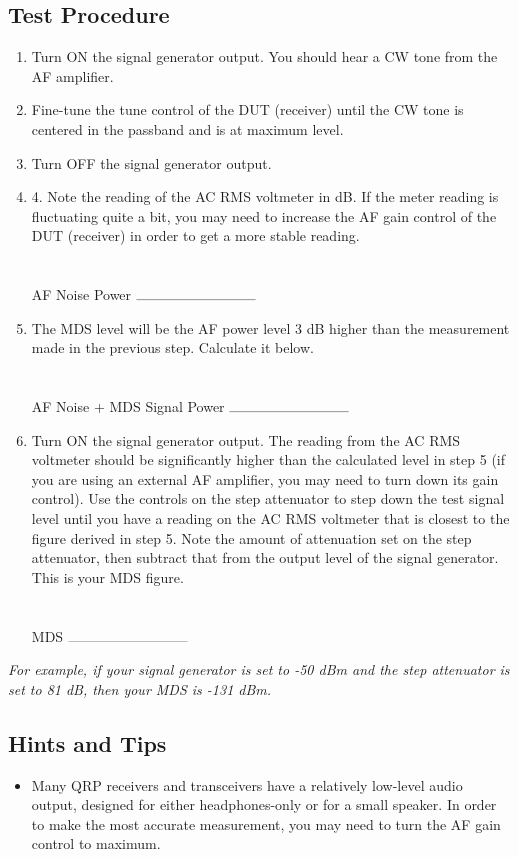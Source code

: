 \documentclass[10pt,letterpaper]{book}
\begin{document}
\subsection*{Test Procedure}
\begin{enumerate}
	\item Turn ON the signal generator output. You should hear a CW tone from the AF amplifier.
	\item Fine-tune the tune control of the DUT (receiver) until the CW tone is centered in the passband and is at maximum level.
	\item Turn OFF the signal generator output.
	\item 4. Note the reading of the AC RMS voltmeter in dB. If the meter reading is fluctuating quite a bit, you may need to increase the AF gain control of the DUT (receiver) in order to get a more stable reading. \\ \\ \\
	AF Noise Power $\rule{3cm}{0.1mm}$
	\item The MDS level will be the AF power level 3 dB higher than the measurement made in the previous step. Calculate it below. \\ \\ \\
	AF Noise + MDS Signal Power $\rule{3cm}{0.1mm}$
	\item Turn ON the signal generator output. The reading from the AC RMS voltmeter should be significantly higher than the calculated level in step 5 (if you are using an external AF amplifier, you may need to turn down its gain control). Use the controls on the step attenuator to step down the test signal level until you have a reading on the AC RMS voltmeter that is closest to the figure derived in step 5. Note the amount of attenuation set on the step attenuator, then subtract that from the output level of the signal generator. This is your MDS figure. \\ \\ \\
	MDS $\rule{3cm}{0.1mm}$
\end{enumerate}
\emph{For example, if your signal generator is set to -50 dBm and the step attenuator is set to 81 dB, then your MDS is -131 dBm.}
\subsection*{Hints and Tips}
\begin{itemize}
	\item Many QRP receivers and transceivers have a relatively low-level audio output, designed for either headphones-only or for a small speaker. In order to make the most accurate measurement, you may need to turn the AF gain control to maximum.
\end{itemize}
\end{document}
